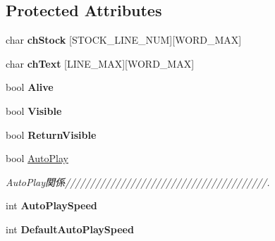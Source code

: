 \subsection*{Protected Attributes}
\begin{DoxyCompactItemize}
\item 
char {\bfseries ch\+Stock} \mbox{[}S\+T\+O\+C\+K\+\_\+\+L\+I\+N\+E\+\_\+\+N\+UM\mbox{]}\mbox{[}W\+O\+R\+D\+\_\+\+M\+AX\mbox{]}\hypertarget{class_c_text_box_ab612e13e1e4952a2f48f0536f4f0c0e9}{}\label{class_c_text_box_ab612e13e1e4952a2f48f0536f4f0c0e9}

\item 
char {\bfseries ch\+Text} \mbox{[}L\+I\+N\+E\+\_\+\+M\+AX\mbox{]}\mbox{[}W\+O\+R\+D\+\_\+\+M\+AX\mbox{]}\hypertarget{class_c_text_box_ad809f7c7bf15d0982d9cbc694cfe1d30}{}\label{class_c_text_box_ad809f7c7bf15d0982d9cbc694cfe1d30}

\item 
bool {\bfseries Alive}\hypertarget{class_c_text_box_a33d176915249c79a01b7fe124c306b0e}{}\label{class_c_text_box_a33d176915249c79a01b7fe124c306b0e}

\item 
bool {\bfseries Visible}\hypertarget{class_c_text_box_ab688c74957be66a13267e3db5c2c9340}{}\label{class_c_text_box_ab688c74957be66a13267e3db5c2c9340}

\item 
bool {\bfseries Return\+Visible}\hypertarget{class_c_text_box_a6d6a8e49bfad0d38a3ddd6111d19ed6c}{}\label{class_c_text_box_a6d6a8e49bfad0d38a3ddd6111d19ed6c}

\item 
bool \hyperlink{class_c_text_box_a823c12940292090e4f6045c55aba4b64}{Auto\+Play}\hypertarget{class_c_text_box_a823c12940292090e4f6045c55aba4b64}{}\label{class_c_text_box_a823c12940292090e4f6045c55aba4b64}

\begin{DoxyCompactList}\small\item\em Auto\+Play関係////////////////////////////////////////. \end{DoxyCompactList}\item 
int {\bfseries Auto\+Play\+Speed}\hypertarget{class_c_text_box_a40fe446e69b168406497c8e487e1e843}{}\label{class_c_text_box_a40fe446e69b168406497c8e487e1e843}

\item 
int {\bfseries Default\+Auto\+Play\+Speed}\hypertarget{class_c_text_box_a121ce1e289cd23c5f176702150366316}{}\label{class_c_text_box_a121ce1e289cd23c5f176702150366316}


\end{DoxyCompactItemize}
